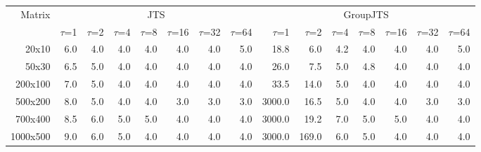\begin{tabular}{rrrrrrrrrrrrrrr}
\toprule
Matrix & \multicolumn{7}{c}{JTS} & \multicolumn{7}{c}{GroupJTS} \\
\cmidrule(lr){2-8} \cmidrule(lr){9-15}
& $\tau$=1 & $\tau$=2 & $\tau$=4 & $\tau$=8 & $\tau$=16 & $\tau$=32 & $\tau$=64 & $\tau$=1 & $\tau$=2 & $\tau$=4 & $\tau$=8 & $\tau$=16 & $\tau$=32 & $\tau$=64 \\
\midrule
20x10 & 6.0 & 4.0 & 4.0 & 4.0 & 4.0 & 4.0 & 5.0 & 18.8 & 6.0 & 4.2 & 4.0 & 4.0 & 4.0 & 5.0 \\
50x30 & 6.5 & 5.0 & 4.0 & 4.0 & 4.0 & 4.0 & 4.0 & 26.0 & 7.5 & 5.0 & 4.8 & 4.0 & 4.0 & 4.0 \\
200x100 & 7.0 & 5.0 & 4.0 & 4.0 & 4.0 & 4.0 & 4.0 & 33.5 & 14.0 & 5.0 & 4.0 & 4.0 & 4.0 & 4.0 \\
500x200 & 8.0 & 5.0 & 4.0 & 4.0 & 3.0 & 3.0 & 3.0 & 3000.0 & 16.5 & 5.0 & 4.0 & 4.0 & 3.0 & 3.0 \\
700x400 & 8.5 & 6.0 & 5.0 & 5.0 & 4.0 & 4.0 & 4.0 & 3000.0 & 19.2 & 7.0 & 5.0 & 5.0 & 4.0 & 4.0 \\
1000x500 & 9.0 & 6.0 & 5.0 & 4.0 & 4.0 & 4.0 & 4.0 & 3000.0 & 169.0 & 6.0 & 5.0 & 4.0 & 4.0 & 4.0 \\
\bottomrule
\end{tabular}
